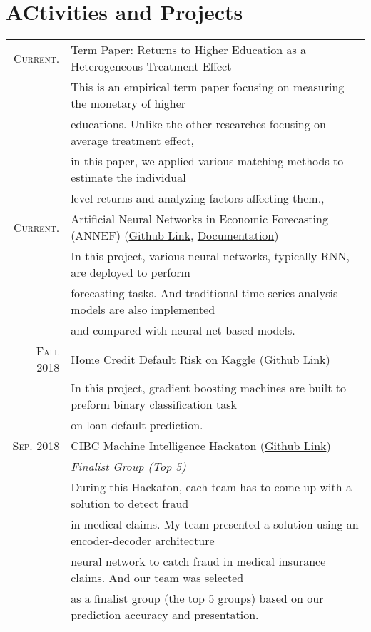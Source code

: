 \documentclass[a4paper,10pt]{article}
\begin{document}
\section{ACtivities and Projects}
\begin{tabular}{rl}
	\textsc{Current.} & Term Paper: Returns to Higher Education as a Heterogeneous Treatment Effect \\
	& \quad This is an empirical term paper focusing on measuring the monetary of higher \\
	& \quad educations. Unlike the other researches focusing on average treatment effect, \\
	& \quad in this paper, we applied various matching methods to estimate the individual \\
	& \quad level returns and analyzing factors affecting them.,\\
	\textsc{Current.} & Artificial Neural Networks in Economic Forecasting (ANNEF) (\href{https://github.com/TianyuDu/AnnEconForecast}{Github Link}, \href{https://tianyudu.github.io/AnnEconForecast/}{Documentation}) \\
	& \quad In this project, various neural networks, typically RNN, are deployed to perform \\
	& forecasting tasks. And traditional time series analysis models are also implemented \\
	& and compared with neural net based models. \\
	\textsc{Fall 2018} & Home Credit Default Risk on Kaggle (\href{https://github.com/UTCAA-Mentorship-2018/tianyudu}{Github Link}) \\
	& \quad In this project, gradient boosting machines are built to preform binary classification task \\
	& on loan default prediction. \\
    \textsc{Sep.} 2018 & CIBC Machine Intelligence Hackaton (\href{https://github.com/TianyuDu/CIBC-MACHINE-INTELLIGENCE-HACKATHON}{Github Link}) \\
    & \emph{Finalist Group (Top 5)} \\
    & \quad During this Hackaton, each team has to come up with a solution to detect fraud \\ 
    & in medical claims. My team presented a solution using an encoder-decoder architecture \\
    & neural network to catch fraud in medical insurance claims. And our team was selected \\ 
    & as a finalist group (the top 5 groups) based on our prediction accuracy and presentation.  \\
\end{tabular}
\end{document}
